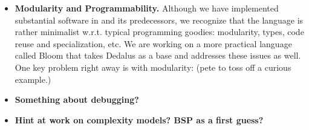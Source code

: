 \begin{itemize}
    \item {\bf Modularity and Programmability.}  Although we have implemented substantial software in \lang and its predecessors, we recognize that the language is rather minimalist w.r.t. typical programming goodies: modularity, types, code reuse and specialization, etc.  We are working on a more practical language called Bloom that takes Dedalus as a base and addresses these issues as well.  One key problem right away is with modularity: (pete to toss off a curious example.)
    
    \item {\bf Something about debugging?}
    
    \item {\bf Hint at work on complexity models?  BSP as a first guess?}
\end{itemize}
